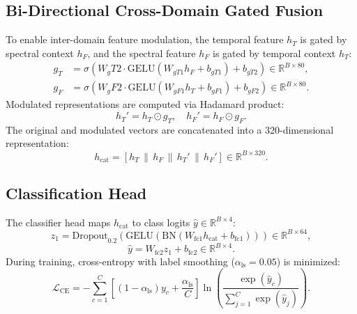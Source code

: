 \documentclass[journal,10pt,twocolumn]{IEEEtran}
\begin{document}
\subsection{Bi-Directional Cross-Domain Gated Fusion}
To enable inter-domain feature modulation, the temporal feature $h_T$ is gated by spectral context $h_F$, and the spectral feature $h_F$ is gated by temporal context $h_T$:
\begin{align}
g_T &= \sigma\left(W_gT2 \cdot \text{GELU}(W_{gT1} h_F + b_{gT1}) + b_{gT2}\right) \in \mathbb{R}^{B \times 80}, \label{eq:gate_t} \\
g_F &= \sigma\left(W_gF2 \cdot \text{GELU}(W_{gF1} h_T + b_{gF1}) + b_{gF2}\right) \in \mathbb{R}^{B \times 80}. \label{eq:gate_f}
\end{align}
Modulated representations are computed via Hadamard product:
\begin{equation}
h_T' = h_T \odot g_T, \quad h_F' = h_F \odot g_F.
\label{eq:mod_feats}
\end{equation}
The original and modulated vectors are concatenated into a 320-dimensional representation:
\begin{equation}
h_{\text{cat}} = [h_T \,\|\, h_F \,\|\, h_T' \,\|\, h_F'] \in \mathbb{R}^{B \times 320}.
\label{eq:fused_cat}
\end{equation}

\subsection{Classification Head}
The classifier head maps $h_{\text{cat}}$ to class logits $\hat{y} \in \mathbb{R}^{B \times 4}$:
\begin{equation}
z_1 = \text{Dropout}_{0.2}\left(\text{GELU}\left(\text{BN}\left(W_{\text{fc1}} h_{\text{cat}} + b_{\text{fc1}}\right)\right)\right) \in \mathbb{R}^{B \times 64},
\label{eq:head_fc1}
\end{equation}
\begin{equation}
\hat{y} = W_{\text{fc2}} z_1 + b_{\text{fc2}} \in \mathbb{R}^{B \times 4}.
\label{eq:head_fc2}
\end{equation}
During training, cross-entropy with label smoothing ($\alpha_{\text{ls}} = 0.05$) is minimized:
\begin{equation}
\mathcal{L}_{\text{CE}} = - \sum_{c=1}^C \left[(1 - \alpha_{\text{ls}}) y_c + \frac{\alpha_{\text{ls}}}{C}\right] \ln\left(\frac{\exp(\hat{y}_c)}{\sum_{j=1}^C \exp(\hat{y}_j)}\right).
\label{eq:loss_ce}
\end{equation}
\end{document}
